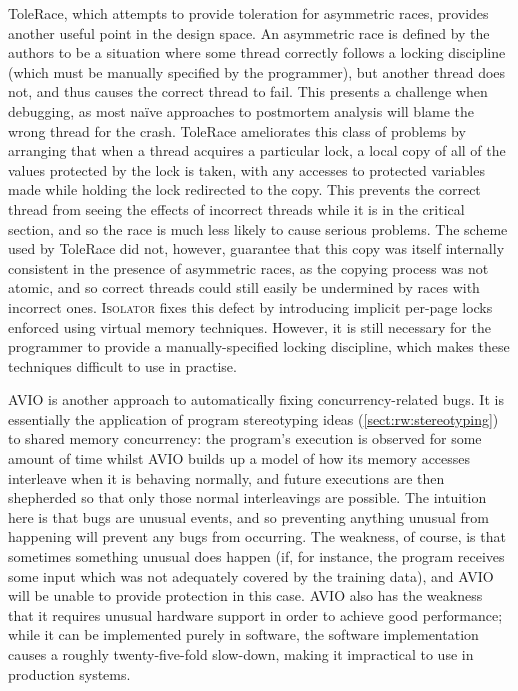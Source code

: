 ToleRace\cite{Kirovski2007}, which attempts to provide toleration for
asymmetric races, provides another useful point in the design space.
An asymmetric race is defined by the authors to be a situation where
some thread correctly follows a locking discipline (which must be
manually specified by the programmer), but another thread does not,
and thus causes the correct thread to fail.  This presents a challenge
when debugging, as most na\"{i}ve approaches to postmortem analysis
will blame the wrong thread for the crash.  ToleRace ameliorates this
class of problems by arranging that when a thread acquires a
particular lock, a local copy of all of the values protected by the
lock is taken, with any accesses to protected variables made while
holding the lock redirected to the copy.  This prevents the correct
thread from seeing the effects of incorrect threads while it is in the
critical section, and so the race is much less likely to cause serious
problems.  The scheme used by ToleRace did not, however, guarantee
that this copy was itself internally consistent in the presence of
asymmetric races, as the copying process was not atomic, and so
correct threads could still easily be undermined by races with
incorrect ones.  \textsc{Isolator}\cite{Ramalingam2009} fixes this
defect by introducing implicit per-page locks enforced using virtual
memory techniques.  However, it is still necessary for the programmer
to provide a manually-specified locking discipline, which makes these
techniques difficult to use in practise.

AVIO\cite{Lu} is another approach to automatically fixing
concurrency-related bugs.  It is essentially the application of
program stereotyping ideas (\autoref{sect:rw:stereotyping}) to shared
memory concurrency: the program's execution is observed for some
amount of time whilst AVIO builds up a model of how its memory
accesses interleave when it is behaving normally, and future
executions are then shepherded so that only those normal interleavings
are possible.  The intuition here is that bugs are unusual events, and
so preventing anything unusual from happening will prevent any bugs
from occurring.  The weakness, of course, is that sometimes something
unusual does happen (if, for instance, the program receives some input
which was not adequately covered by the training data), and AVIO will
be unable to provide protection in this case.  AVIO also has the
weakness that it requires unusual hardware support in order to achieve
good performance; while it can be implemented purely in software, the
software implementation causes a roughly twenty-five-fold slow-down,
making it impractical to use in production systems.

